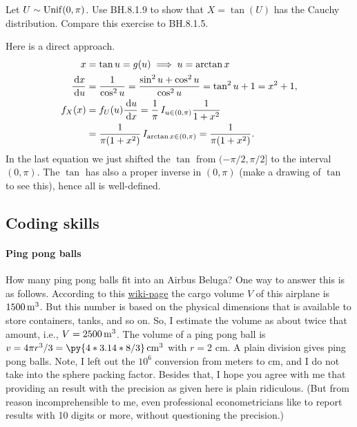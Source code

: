 \documentclass[assignments]{subfiles}
\begin{document}
\begin{exercise}
Let $U \sim  \mathrm{Unif}(0, \pi)$.
Use  BH.8.1.9 to show that $X = \tan(U)$ has the Cauchy distribution. Compare this exercise to BH.8.1.5.
\begin{solution}
Here is a direct approach.
  \begin{align}
    \label{eq:20}
x&=\tan u = g(u) \implies u = \arctan x\\
\frac{\,\textrm{d}x}{\,\textrm{d}u } &= \frac{1}{\cos^{2} u} = \frac{\sin^{2}u + \cos^{2}u }{\cos^{2}u} = \tan^{2} u + 1 = x^{2} + 1,\\
f_{X}(x) &= f_{U}(u) \frac{\,\textrm{d}u}{\,\textrm{d}x} = \frac{1}{\pi}\,I_{u\in (0, \pi)} \frac{1}{1+x^{2}} \\
&=\frac{1}{\pi(1+x^{2})}\,I_{\arctan x \in (0, \pi)} =\frac{1}{\pi(1+x^{2})}.
  \end{align}
  In the last equation we just shifted the $\tan$ from $(-\pi/2, \pi/2]$ to the interval $(0, \pi)$.
  The $\tan$ has also a proper inverse in $(0,\pi)$ (make a drawing of $\tan$ to see this), hence all is well-defined.
\end{solution}
\end{exercise}



\subsection{Coding skills}
\label{sec:coding-skills-1}

\paragraph{Ping pong balls}



How many ping pong balls fit into an Airbus Beluga?
One way to answer this is as follows.
According to this \href{https://en.wikipedia.org/wiki/Airbus\_Beluga}{wiki-page} the cargo volume $V$ of this airplane is $1500 \,\mathrm{m}^{3}$.
But this number is based on the physical dimensions that is available to store containers, tanks, and so on.
So, I estimate the volume as about twice that amount, i.e., $V = 2500 \,\mathrm{m}^{3}$.
The volume of a ping pong ball is $v = 4 \pi r^3/3  = \py{4*3.14*8/3} \cm^{3}$ with $r=2$ cm.
A plain division gives  ping pong balls.
Note, I left out the $10^{6}$ conversion from meters to cm, and I do not take into the sphere packing factor.
Besides that, I hope you agree with me that providing an result with the precision as given here is plain ridiculous.
(But from reason incomprehensible to me, even professional econometricians like to report results with 10 digits or more, without questioning the precision.)
\end{document}
